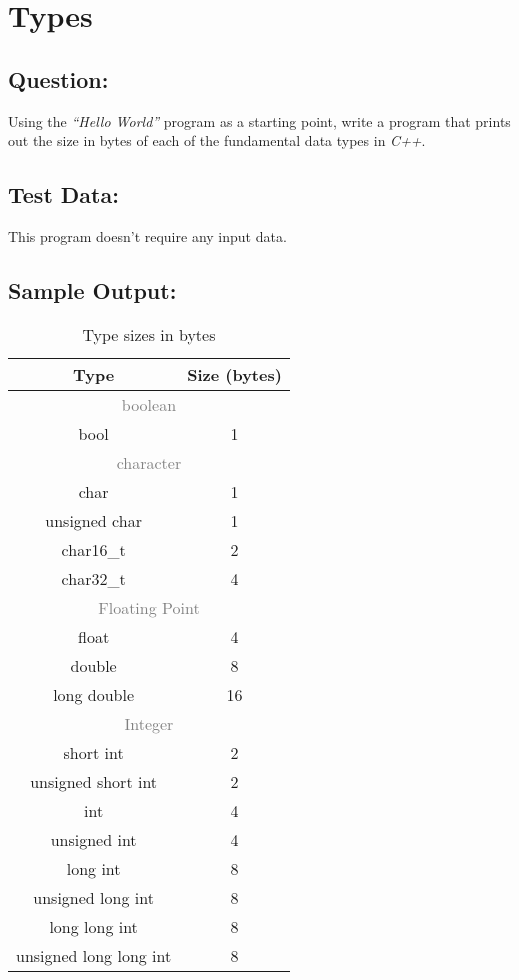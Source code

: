 \section{Types}
    \subsection*{Question:}
        Using the \textit{“Hello World”} program as a starting point, 
        write a program that prints out the size in bytes of each of the fundamental data types in \textit{C++}.

    \subsection*{Test Data:}
        This program doesn't require any input data.
        
    \subsection*{Sample Output:}
        \begin{table}[H]
            \centering
            \begin{tabular}{c c}
                \hline
                \textbf{Type} & \textbf{Size (bytes)} \\
                \hline
                \multicolumn{2}{c}{\textcolor{gray}{boolean}} \\
                bool & 1 \\
                \multicolumn{2}{c}{\textcolor{gray}{character}} \\
                char & 1 \\
                unsigned char & 1 \\
                char16\_t & 2 \\
                char32\_t & 4 \\
                \multicolumn{2}{c}{\textcolor{gray}{Floating Point}} \\
                float & 4 \\
                double & 8 \\
                long double & 16 \\
                \multicolumn{2}{c}{\textcolor{gray}{Integer}} \\
                short int & 2 \\
                unsigned short int & 2 \\
                int & 4 \\
                unsigned int & 4 \\
                long int & 8 \\
                unsigned long int & 8 \\
                long long int & 8 \\
                unsigned long long int & 8 \\
                \hline
            \end{tabular}
            \caption{Type sizes in bytes}
        \end{table}

